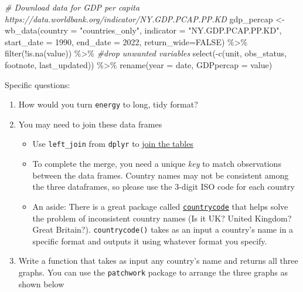 \documentclass[
]{article}
\newenvironment{Shaded}{\begin{snugshade}}{\end{snugshade}}
\newcommand{\AttributeTok}[1]{\textcolor[rgb]{0.77,0.63,0.00}{#1}}
\newcommand{\CommentTok}[1]{\textcolor[rgb]{0.56,0.35,0.01}{\textit{#1}}}
\newcommand{\ConstantTok}[1]{\textcolor[rgb]{0.00,0.00,0.00}{#1}}
\newcommand{\DecValTok}[1]{\textcolor[rgb]{0.00,0.00,0.81}{#1}}
\newcommand{\FunctionTok}[1]{\textcolor[rgb]{0.00,0.00,0.00}{#1}}
\newcommand{\NormalTok}[1]{#1}
\newcommand{\OtherTok}[1]{\textcolor[rgb]{0.56,0.35,0.01}{#1}}
\newcommand{\SpecialCharTok}[1]{\textcolor[rgb]{0.00,0.00,0.00}{#1}}
\newcommand{\StringTok}[1]{\textcolor[rgb]{0.31,0.60,0.02}{#1}}
\providecommand{\tightlist}{%
  \setlength{\itemsep}{0pt}\setlength{\parskip}{0pt}}
\begin{document}
\begin{Shaded}
\begin{Highlighting}[]
\CommentTok{\# Download data for GDP per capita  https://data.worldbank.org/indicator/NY.GDP.PCAP.PP.KD}
\NormalTok{gdp\_percap }\OtherTok{\textless{}{-}} \FunctionTok{wb\_data}\NormalTok{(}\AttributeTok{country =} \StringTok{"countries\_only"}\NormalTok{, }
                      \AttributeTok{indicator =} \StringTok{"NY.GDP.PCAP.PP.KD"}\NormalTok{, }
                      \AttributeTok{start\_date =} \DecValTok{1990}\NormalTok{, }
                      \AttributeTok{end\_date =} \DecValTok{2022}\NormalTok{,}
                      \AttributeTok{return\_wide=}\ConstantTok{FALSE}\NormalTok{) }\SpecialCharTok{\%\textgreater{}\%} 
  \FunctionTok{filter}\NormalTok{(}\SpecialCharTok{!}\FunctionTok{is.na}\NormalTok{(value)) }\SpecialCharTok{\%\textgreater{}\%} 
  \CommentTok{\#drop unwanted variables}
  \FunctionTok{select}\NormalTok{(}\SpecialCharTok{{-}}\FunctionTok{c}\NormalTok{(unit, obs\_status, footnote, last\_updated)) }\SpecialCharTok{\%\textgreater{}\%} 
  \FunctionTok{rename}\NormalTok{(}\AttributeTok{year =}\NormalTok{ date,}
         \AttributeTok{GDPpercap =}\NormalTok{ value)}
\end{Highlighting}
\end{Shaded}

Specific questions:

\begin{enumerate}
\def\labelenumi{\arabic{enumi}.}
\tightlist
\item
  How would you turn \texttt{energy} to long, tidy format?
\item
  You may need to join these data frames

  \begin{itemize}
  \tightlist
  \item
    Use \texttt{left\_join} from \texttt{dplyr} to
    \href{http://r4ds.had.co.nz/relational-data.html}{join the tables}
  \item
    To complete the merge, you need a unique \emph{key} to match
    observations between the data frames. Country names may not be
    consistent among the three dataframes, so please use the 3-digit ISO
    code for each country
  \item
    An aside: There is a great package called
    \href{https://github.com/vincentarelbundock/countrycode}{\texttt{countrycode}}
    that helps solve the problem of inconsistent country names (Is it
    UK? United Kingdom? Great Britain?). \texttt{countrycode()} takes as
    an input a country's name in a specific format and outputs it using
    whatever format you specify.
  \end{itemize}
\item
  Write a function that takes as input any country's name and returns
  all three graphs. You can use the \texttt{patchwork} package to
  arrange the three graphs as shown below
\end{enumerate}
\end{document}
